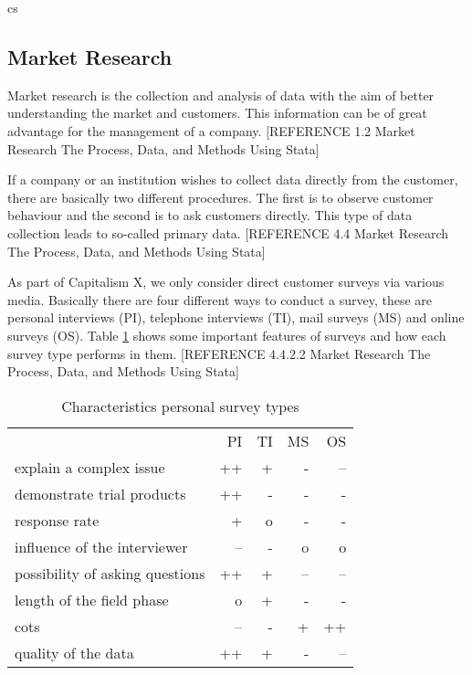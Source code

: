 \gls{cs} %
\subsection{Market Research}
Market research is the collection and analysis of data with the aim of better understanding the market and customers. This information can be of great advantage for the management of a company. [REFERENCE 1.2 Market Research The Process, Data, and Methods Using Stata]

If a company or an institution wishes to collect data directly from the customer, there are basically two different procedures. The first is to observe customer behaviour and the second is to ask customers directly. This type of data collection leads to so-called primary data. [REFERENCE 4.4 Market Research The Process, Data, and Methods Using Stata]

As part of Capitalism X, we only consider direct customer surveys via various media. Basically there are four different ways to conduct a survey, these are personal interviews (PI), telephone interviews (TI), mail surveys (MS) and online surveys (OS). Table \ref{MR_survey_types_characteristics} shows some important features of surveys and how each survey type performs in them. [REFERENCE 4.4.2.2 Market Research The Process, Data, and Methods Using Stata] 

\begin{table}[ht]
\centering
\begin{tabular}{|l|r|r|r|r|}
\hline
        & PI & TI  & MS & OS \\
explain a complex issue         & ++    & +     & -    & --  \\
demonstrate trial products      & ++    & -     & -    & -   \\
response rate                   & +     & o     & -    & -   \\
influence of the interviewer    & --    & -     & o    & o   \\
possibility of asking questions & ++    & +     & --   & --  \\
length of the field phase       & o     & +     & -    & -   \\
cots                            & --    & -     & +    & ++  \\
quality of the data             & ++    & +     & -    & --  \\
\hline
\end{tabular}
\caption{Characteristics personal survey types}
\label{MR_survey_types_characteristics}
\end{table}

